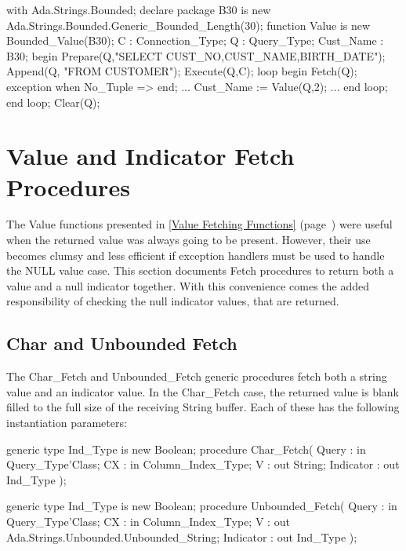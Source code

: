 \documentclass[english,letterpaper]{book}
\newcommand\Ref[1]{\textsection\ref{#1} (page~\pageref{#1})}
\begin{document}
\begin{Example}
with Ada.Strings.Bounded;
declare
   package B30 is new 
      Ada.Strings.Bounded.Generic_Bounded_Length(30);
   function Value is new Bounded_Value(B30); 
   C :         Connection_Type;
   Q :         Query_Type;
   Cust_Name : B30;
begin
   Prepare(Q,"SELECT CUST_NO,CUST_NAME,BIRTH_DATE");
   Append(Q, "FROM CUSTOMER");
   Execute(Q,C);
   loop
      begin
         Fetch(Q);
      exception
         when No_Tuple =>
      end;
      ...
      Cust_Name := Value(Q,2);
      ...
      end loop;
   end loop;
   Clear(Q);
\end{Example}

\section{Value and Indicator Fetch Procedures\label{Value and Indicator Fetch Procedures}}

The Value functions presented in
\Ref{Value Fetching Functions} were useful when the returned value was
always going to be present. However, their use becomes clumsy and less
efficient if exception handlers must be used to handle the
NULL value case. This section documents Fetch procedures to
return both a value and a null indicator together. With this convenience
comes the added responsibility of checking the null
indicator values, that are returned.


\subsection{Char and Unbounded Fetch}

The Char\_Fetch and Unbounded\_Fetch generic procedures
fetch both a string value and an indicator value. In the Char\_Fetch
case, the returned value is blank filled to the full size of the receiving
String buffer. Each of these has the following instantiation parameters:

\begin{Code}
generic
   type Ind_Type is new Boolean;
procedure Char_Fetch(
   Query :     in     Query_Type'Class;
   CX :        in     Column_Index_Type;
   V :            out String;
   Indicator :    out Ind_Type
);
\end{Code}

\begin{Code}
generic
   type Ind_Type is new Boolean;
procedure Unbounded_Fetch(
   Query :     in     Query_Type'Class;
   CX :        in     Column_Index_Type;
   V :            out Ada.Strings.Unbounded.Unbounded_String;
   Indicator :    out Ind_Type
);
\end{Code}
\end{document}
